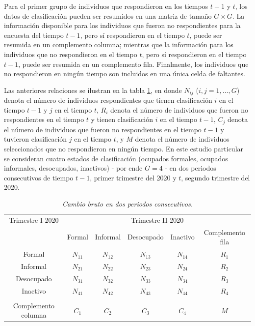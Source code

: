 \documentclass[
  10pt,
  spanish,
]{book}
\begin{document}
Para el primer grupo de individuos que respondieron en los tiempos \(t-1\) y \(t\), los datos de clasificación pueden ser resumidos en una matriz de tamaño \(G\times G\). La información disponible para los individuos que fueron no respondientes para la encuesta del tiempo \(t-1\), pero sí respondieron en el tiempo \(t\), puede ser resumida en un complemento columna; mientras que la información para los individuos que no respondieron en el tiempo \(t\), pero sí respondieron en el tiempo \(t-1\), puede ser resumida en un complemento fila. Finalmente, los individuos que no respondieron en ningún tiempo son incluidos en una única celda de faltantes.

Las anteriores relaciones se ilustran en la tabla \ref{t1}, en donde \(N_{ij}\) (\(i,j=1,\ldots,G\)) denota el número de individuos respondientes que tienen clasificación \(i\) en el tiempo \(t-1\) y \(j\) en el tiempo \(t\), \(R_i\) denota el número de individuos que fueron no respondientes en el tiempo \(t\) y tienen clasificación \(i\) en el tiempo \(t-1\), \(C_j\) denota el número de individuos que fueron no respondientes en el tiempo \(t-1\) y tuvieron clasificación \(j\) en el tiempo \(t\), y \(M\) denota el número de individuos seleccionados que no respondieron en ningún tiempo. En este estudio particular se consideran cuatro estados de clasificación (ocupados formales, ocupados informales, desocupados, inactivos) - por ende \(G = 4\) - en dos periodos consecutivos de tiempo \(t-1\), primer trimestre del 2020 y \(t\), segundo trimestre del 2020.

\begin{table}[!h]
\centering
\begin{tabular}{cccccc}
Trimestre I-2020    &\multicolumn{5}{c}{Trimestre II-2020}\\\cline{2-6}
&Formal&Informal&Desocupado&Inactivo&Complemento fila\\\hline
Formal&$N_{11}$&$N_{12}$&$N_{13}$&$N_{14}$&$R_1$\\
Informal&$N_{21}$&$N_{22}$&$N_{23}$&$N_{24}$&$R_2$\\
Desocupado&$N_{31}$&$N_{32}$&$N_{33}$&$N_{34}$&$R_3$\\
Inactivo&$N_{41}$&$N_{42}$&$N_{43}$&$N_{44}$&$R_4$\\ \\
Complemento columna&$C_1$&$C_2$&$C_3$&$C_4$&$M$\\\hline
\end{tabular}
\caption{\emph{Cambio bruto en dos periodos consecutivos.}}
\label{t1}
\end{table}
\end{document}
